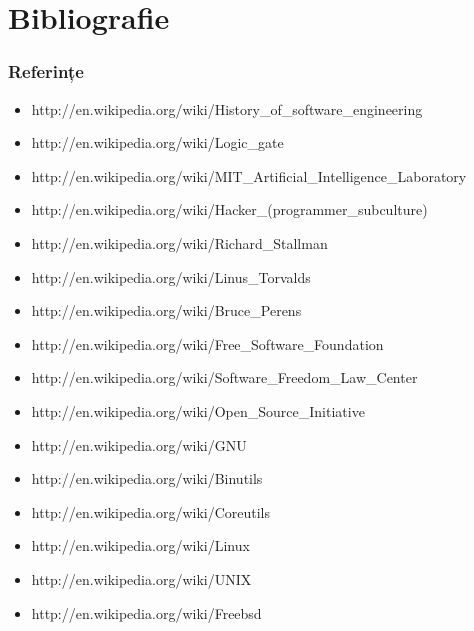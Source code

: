 \documentclass{beamer}
\begin{document}
\section{Bibliografie}
\frame{\tableofcontents[currentsection]}
\begin{frame}[allowframebreaks] %
\frametitle{Referințe}
\begin{itemize}
\item {}
{http://en.wikipedia.org/wiki/History\_of\_software\_engineering}
\item {}
{http://en.wikipedia.org/wiki/Logic\_gate}
\item {}
{http://en.wikipedia.org/wiki/MIT\_Artificial\_Intelligence\_Laboratory}
\item {}
{http://en.wikipedia.org/wiki/Hacker\_(programmer\_subculture)}
\item {} {http://en.wikipedia.org/wiki/Richard\_Stallman}
\item {}
{http://en.wikipedia.org/wiki/Linus\_Torvalds}
\item {}
{http://en.wikipedia.org/wiki/Bruce\_Perens}
\item {}
{http://en.wikipedia.org/wiki/Free\_Software\_Foundation}
\item {}
{http://en.wikipedia.org/wiki/Software\_Freedom\_Law\_Center}
\item {}
{http://en.wikipedia.org/wiki/Open\_Source\_Initiative}
\item {} {http://en.wikipedia.org/wiki/GNU}
\item {} {http://en.wikipedia.org/wiki/Binutils}
\item {}
{http://en.wikipedia.org/wiki/Coreutils}
\item {} {http://en.wikipedia.org/wiki/Linux}
\item {} {http://en.wikipedia.org/wiki/UNIX}
\item {} {http://en.wikipedia.org/wiki/Freebsd}
\end{itemize}
\end{frame}
\end{document}
